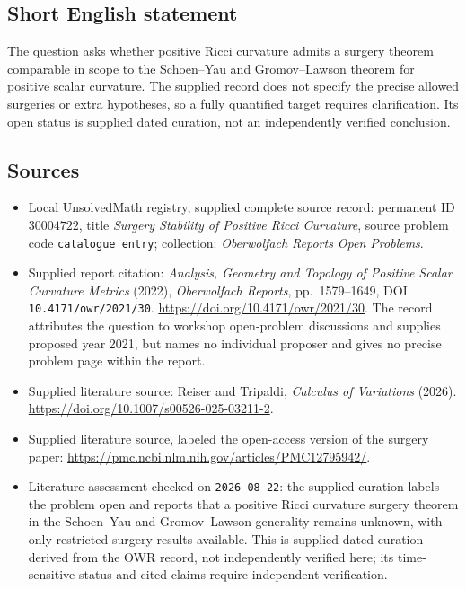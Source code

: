\documentclass[11pt]{article}
\begin{document}
\subsection{Short English statement}
The question asks whether positive Ricci curvature admits a surgery theorem comparable in scope to the Schoen--Yau and Gromov--Lawson theorem for positive scalar curvature. The supplied record does not specify the precise allowed surgeries or extra hypotheses, so a fully quantified target requires clarification. Its open status is supplied dated curation, not an independently verified conclusion.
\subsection{Sources}
\begin{itemize}
\item Local UnsolvedMath registry, supplied complete source record: permanent ID \(30004722\), title \emph{Surgery Stability of Positive Ricci Curvature}, source problem code \texttt{catalogue entry}; collection: \emph{Oberwolfach Reports Open Problems}.
\item Supplied report citation: \emph{Analysis, Geometry and Topology of Positive Scalar Curvature Metrics} (2022), \emph{Oberwolfach Reports}, pp.\ 1579--1649, DOI \texttt{10.4171/owr/2021/30}. \url{https://doi.org/10.4171/owr/2021/30}. The record attributes the question to workshop open-problem discussions and supplies proposed year 2021, but names no individual proposer and gives no precise problem page within the report.
\item Supplied literature source: Reiser and Tripaldi, \emph{Calculus of Variations} (2026). \url{https://doi.org/10.1007/s00526-025-03211-2}.
\item Supplied literature source, labeled the open-access version of the surgery paper: \url{https://pmc.ncbi.nlm.nih.gov/articles/PMC12795942/}.
\item Literature assessment checked on \texttt{2026-08-22}: the supplied curation labels the problem open and reports that a positive Ricci curvature surgery theorem in the Schoen--Yau and Gromov--Lawson generality remains unknown, with only restricted surgery results available. This is supplied dated curation derived from the OWR record, not independently verified here; its time-sensitive status and cited claims require independent verification.
\end{itemize}
\end{document}
